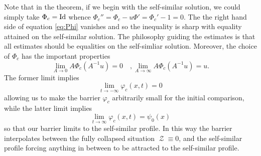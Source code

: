 \documentclass[11pt]{amsart}
\DeclareMathOperator{\chordarcprofile}{\mathcal{Z}}
\begin{document}
\begin{remark}
Note that in the theorem, if we begin with the self-similar solution, we could simply take $\Phi_c = \operatorname{Id}$ whence $\Phi_c'' = \Phi_c - u \Phi' = \Phi_c' - 1 = 0$. The the right hand side of equation \eqref{eq:Phi} vanishes and so the inequality is sharp with equality attained on the self-similar solution. The philosophy guiding the estimates is that all estimates should be equalities on the self-simliar solution. Moreover, the choice of $\Phi_c$ has the important properties
\[
\lim_{A\to 0} A \Phi_c (A^{-1} u) = 0 \quad, \lim_{A\to \infty} A \Phi_c (A^{-1} u) = u.
\]
The former limit implies
\[
\lim_{t\to-\infty} \varphi_c(x, t) = 0
\]
allowing us to make the barrier $\varphi_c$ arbitrarily small for the initial comparison, while the latter limit implies
\[
\lim_{t\to \infty} \varphi_c(x, t) = \psi_0(x)
\]
so that our barrier limits to the self-similar profile. In this way the barrier interpolates between the fully collapsed situation $\chordarcprofile \equiv 0$, and the self-similar profile forcing anything in between to be attracted to the self-similar profile.
\end{remark}
\end{document}
